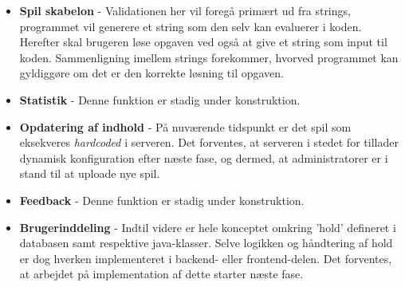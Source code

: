\documentclass[12pt, a4paper]{article}
\begin{document}
\begin{itemize}
  \item \textbf{Spil skabelon} - %
  Validationen her vil foregå primært ud fra strings, programmet vil generere et string som den selv kan evaluerer i koden. Herefter skal brugeren løse opgaven ved også at give et string som input til koden. Sammenligning imellem strings forekommer, hvorved programmet kan gyldiggøre om det er den korrekte løsning til opgaven.
  
  
  \item \textbf{Statistik} - %
  Denne funktion er stadig under konstruktion.
  
  \item \textbf{Opdatering af indhold} - %
 På nuværende tidspunkt er det spil som eksekveres \emph{hardcoded} i serveren. Det forventes, at serveren i stedet for tillader dynamisk konfiguration efter næste fase, og dermed, at administratorer er i stand til at uploade nye spil.
  
  \item \textbf{Feedback} - %
  Denne funktion er stadig under konstruktion.
  
  
  \item \textbf{Brugerinddeling} - %
  Indtil videre er hele konceptet omkring 'hold' defineret i databasen samt respektive java-klasser. Selve logikken og håndtering af hold er dog hverken implementeret i backend- eller frontend-delen. Det forventes, at arbejdet på implementation af dette starter næste fase.
  
\end{itemize}
\end{document}
